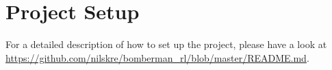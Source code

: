 \setcounter{section}{-1}
\section{Project Setup} \label{setup}

For a detailed description of how to set up the project, please have a look at \url{https://github.com/nilskre/bomberman_rl/blob/master/README.md}.